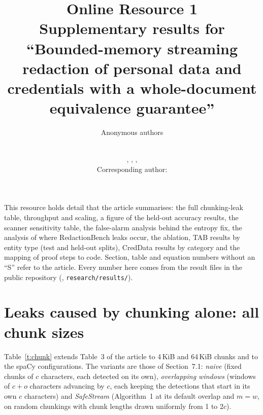 \documentclass[11pt,a4paper]{article}
\title{Online Resource 1\\[4pt]\large Supplementary results for ``Bounded-memory streaming redaction of personal data and credentials with a whole-document equivalence guarantee''}
\author{Anonymous authors}
\author{\ssAuthorList\\
\small \ssDept, \ssOrg, \ssCity, \ssCountry\\
\small Corresponding author: \ssCorresponding}
\date{}
\begin{document}
\maketitle

\noindent This resource holds detail that the article summarises: the full chunking-leak table, throughput and scaling, a figure of the held-out accuracy results, the scanner sensitivity table, the false-alarm analysis behind the entropy fix, the analysis of where RedactionBench leaks occur, the ablation, TAB results by entity type (test and held-out splits), CredData results by category and the mapping of proof steps to code. Section, table and equation numbers without an ``S'' refer to the article. Every number here comes from the result files in the public repository (\repolink{}, \texttt{research/results/}).

\section{Leaks caused by chunking alone: all chunk sizes}\label{s:chunk}

Table~\ref{t:chunk} extends Table~3 of the article to 4\,KiB and 64\,KiB chunks and to the spaCy configurations. The variants are those of Section~7.1: \emph{naive} (fixed chunks of $c$ characters, each detected on its own), \emph{overlapping windows} (windows of $c + o$ characters advancing by $c$, each keeping the detections that start in its own $c$ characters) and \emph{SafeStream} (Algorithm~1 at its default overlap and $m = w$, on random chunkings with chunk lengths drawn uniformly from 1 to $2c$).
\end{document}
